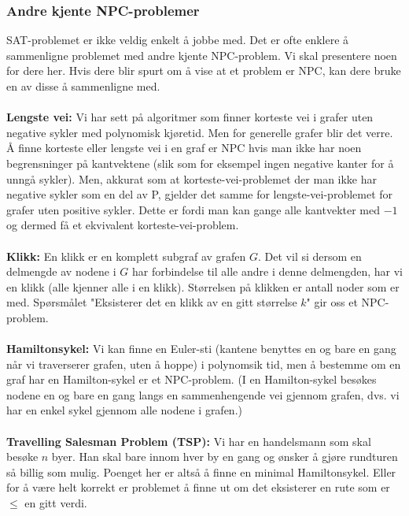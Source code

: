 \subsubsection{Andre kjente NPC-problemer}
SAT-problemet er ikke veldig enkelt å jobbe med. Det er ofte enklere å sammenligne problemet med andre kjente NPC-problem. Vi skal presentere noen for dere her. Hvis dere blir spurt om å vise at et problem er NPC, kan dere bruke en av disse å sammenligne med.
\\\\
\textbf{Lengste vei:} Vi har sett på algoritmer som finner korteste vei i grafer uten negative sykler med polynomisk kjøretid. Men for generelle grafer blir det verre. Å finne korteste eller lengste vei i en graf er NPC hvis man ikke har noen begrensninger på kantvektene (slik som for eksempel ingen negative kanter for å unngå sykler). Men, akkurat som at korteste-vei-problemet der man ikke har negative sykler som en del av P, gjelder det samme for lengste-vei-problemet for grafer uten positive sykler. Dette er fordi man kan gange alle kantvekter med $-1$ og dermed få et ekvivalent korteste-vei-problem.
\\\\
\textbf{Klikk:} En klikk er en komplett subgraf av grafen $G$. Det vil si dersom en delmengde av nodene i $G$ har forbindelse til alle andre i denne delmengden, har vi en klikk (alle kjenner alle i en klikk). Størrelsen på klikken er antall noder som er med. Spørsmålet "Eksisterer det en klikk av en gitt størrelse $k$" gir oss et NPC-problem.
\\\\
\textbf{Hamiltonsykel:} Vi kan finne en Euler-sti (kantene benyttes en og bare en gang når vi traverserer grafen, uten å hoppe) i polynomsik tid, men å bestemme om en graf har en Hamilton-sykel er et NPC-problem. (I en Hamilton-sykel besøkes nodene en og bare en gang langs en sammenhengende vei gjennom grafen, dvs. vi har en enkel sykel gjennom alle nodene i grafen.)
\\\\
\textbf{Travelling Salesman Problem (TSP):} Vi har en handelsmann som skal besøke $n$ byer. Han skal bare innom hver by en gang og ønsker å gjøre rundturen så billig som mulig. Poenget her er altså å finne en minimal Hamiltonsykel. Eller for å være helt korrekt er problemet å finne ut om det eksisterer en rute som er $\leq$ en gitt verdi.